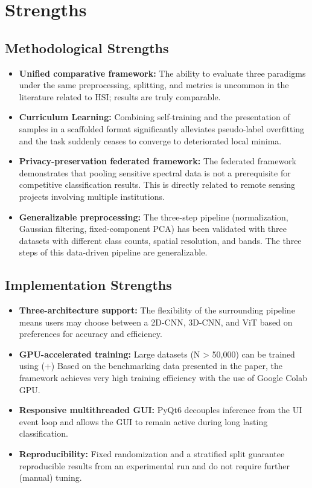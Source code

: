 \section{Strengths}

\subsection{Methodological Strengths}
\begin{itemize}
    \item \textbf{Unified comparative framework:} The ability to evaluate three paradigms under the same preprocessing, splitting, and metrics is uncommon in the literature related to HSI; results are truly comparable.

    \item \textbf{Curriculum Learning:} Combining self-training and the presentation of samples in a scaffolded format significantly alleviates pseudo-label overfitting and the task suddenly ceases to converge to deteriorated local minima.

    \item \textbf{Privacy-preservation federated framework:} The federated framework demonstrates that pooling sensitive spectral data is not a prerequisite for competitive classification results. This is directly related to remote sensing projects involving multiple institutions.

    \item \textbf{Generalizable preprocessing:} The three-step pipeline (normalization, Gaussian filtering, fixed-component PCA) has been validated with three datasets with different class counts, spatial resolution, and bands. The three steps of this data-driven pipeline are generalizable.
\end{itemize}

\subsection{Implementation Strengths}
\begin{itemize}
    \item \textbf{Three-architecture support:} The flexibility of the surrounding pipeline means users may choose between a 2D-CNN, 3D-CNN, and ViT based on preferences for accuracy and efficiency.

    \item \textbf{GPU-accelerated training:} Large datasets (N > 50,000) can be trained using (+) Based on the benchmarking data presented in the paper, the framework achieves very high training efficiency with the use of Google Colab GPU.

    \item \textbf{Responsive multithreaded GUI:} PyQt6 decouples inference from the UI event loop and allows the GUI to remain active during long lasting classification.

    \item \textbf{Reproducibility:} Fixed randomization and a stratified split guarantee reproducible results from an experimental run and do not require further (manual) tuning.
\end{itemize}

